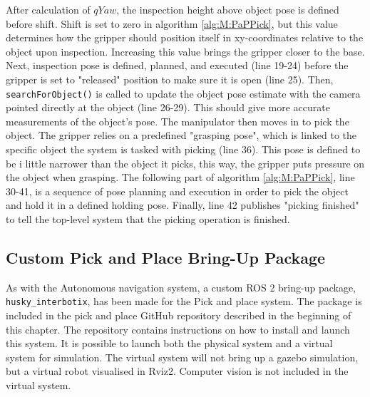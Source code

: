 After calculation of $qYaw$, the inspection height above object pose is defined before shift. Shift is set to zero in algorithm \ref{alg:M:PaPPick}, but this value determines how the gripper should position itself in xy-coordinates relative to the object upon inspection. Increasing this value brings the gripper closer to the base. Next, inspection pose is defined, planned, and executed (line 19-24) before the gripper is set to "released" position to make sure it is open (line 25). Then, \lstinline{searchForObject()} is called to update the object pose estimate with the camera pointed directly at the object (line 26-29). This should give more accurate measurements of the object's pose.  The manipulator then moves in to pick the object. The gripper relies on a predefined "grasping pose", which is linked to the specific object the system is tasked with picking (line 36). This pose is defined to be i little narrower than the object it picks, this way, the gripper puts pressure on the object when grasping. The following part of algorithm \ref{alg:M:PaPPick}, line 30-41, is a sequence of pose planning and execution in order to pick the object and hold it in a defined holding pose. Finally, line 42 publishes "picking finished" to tell the top-level system that the picking operation is finished.

\subsection{Custom Pick and Place Bring-Up Package} \label{sec:M:PAP:CutsomPAPBringup}
As with the Autonomous navigation system, a custom ROS 2 bring-up package, \lstinline{husky_interbotix}, has been made for the Pick and place system. The package is included in the pick and place GitHub repository described in the beginning of this chapter. The repository contains instructions on how to install and launch this system. It is possible to launch both the physical system and a virtual system for simulation. The virtual system will not bring up a gazebo simulation, but a virtual robot visualised in Rviz2. Computer vision is not included in the virtual system.


